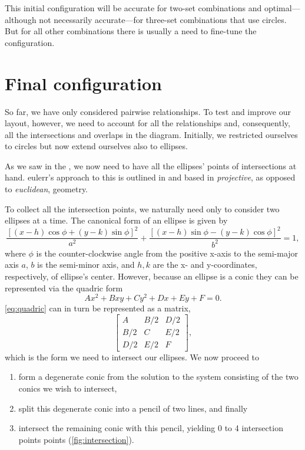 \documentclass[
  oneside,
  openany,
  numbers=noendperiod,
  parskip=half,
  bibliography=totoc
]{scrbook}\usepackage[]{graphicx}\usepackage{xcolor}
\newcommand{\pkg}[1]{{\fontseries{b}\selectfont #1}}
\begin{document}
This initial configuration will be accurate for two-set combinations and
optimal---although not necessarily accurate---for three-set combinations that
use circles. But for all other combinations there is usually a need to fine-tune
the configuration.

\section{Final configuration}
\label{sec:finalConfig}

So far, we have only considered pairwise relationships. To test and improve our
layout, however, we need to account for all the relationships and, consequently,
all the intersections and overlaps in the diagram. Initially, we restricted
ourselves to circles but now extend ourselves also to ellipses.

As we saw in the , we now need to have all the ellipses'
points of intersections at hand. \pkg{eulerr}'s approach to this is outlined in
\citet{richter-gebert_2011} and based in \emph{projective}, as opposed to
\emph{euclidean}, geometry.

To collect all the intersection points, we naturally need only to consider two
ellipses at a time. The canonical form of an ellipse is given by
\begin{equation*}
\frac{\left[ (x-h)\cos{\phi}+(y-k)\sin{\phi} \right]^2}{a^2}+
  \frac{\left[(x-h) \sin{\phi}-(y-k) \cos{\phi}\right]^2}{b^2} = 1,
\end{equation*}
where $\phi$ is the counter-clockwise angle from the positive x-axis to the
semi-major axis $a$, $b$ is the semi-minor axis, and $h, k$ are the x- and
y-coordinates, respectively, of ellipse's center. However, because an ellipse
is a conic they
can be represented via the quadric form
\begin{equation}
Ax^2 + Bxy + Cy^2 + Dx + Ey + F = 0.
\label{eq:quadric}
\end{equation}
\eqref{eq:quadric} can in turn be represented as a matrix,
\begin{equation*}
\begin{bmatrix}
A   & B/2 & D/2 \\
B/2 & C   & E/2 \\
D/2 & E/2 & F
\end{bmatrix},
\end{equation*}
which is the form we need to intersect our ellipses. We now proceed to
\begin{enumerate}
\item form a degenerate conic from the solution to the system consisting of the
  two conics we wish to intersect,
\item split this degenerate conic into a pencil of two lines, and finally
\item intersect the remaining conic with this pencil, yielding 0 to 4
  intersection points points (\cref{fig:intersection}).
\end{enumerate}
\end{document}
